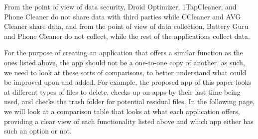     From the point of view of data security, Droid Optimizer, 1TapCleaner, and Phone Cleaner do not share data with third parties while CCleaner and AVG Cleaner share data, and from the point of view of data collection, Battery Guru and Phone Cleaner do not collect, while the rest of the applications collect data. 

    For the purpose of creating an application that offers a similar function as the ones listed above, the app should not be a one-to-one copy of another, as such, we need to look at these sorts of comparisons, to better understand what could be improved upon and added. For example, the proposed app of this paper looks at different types of files to delete, checks up on apps by their last time being used, and checks the trash folder for potential residual files. In the following page, we will look at a comparison table that looks at what each application offers, providing a clear view of each functionality listed above and which app either has such an option or not.

